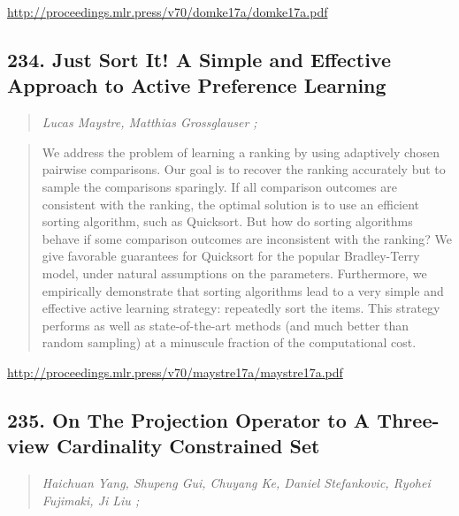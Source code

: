 \documentclass{article}
\begin{document}
\href{http://proceedings.mlr.press/v70/domke17a/domke17a.pdf}{http://proceedings.mlr.press/v70/domke17a/domke17a.pdf}

\subsection{234. Just Sort It! A Simple and Effective Approach to Active Preference Learning}

\begin{quote}
\footnotesize{\textit{Lucas Maystre, Matthias Grossglauser ;}}
\end{quote}

\begin{quote}
    We address the problem of learning a ranking by using adaptively chosen pairwise comparisons. Our goal is to recover the ranking accurately but to sample the comparisons sparingly. If all comparison outcomes are consistent with the ranking, the optimal solution is to use an efficient sorting algorithm, such as Quicksort. But how do sorting algorithms behave if some comparison outcomes are inconsistent with the ranking? We give favorable guarantees for Quicksort for the popular Bradley-Terry model, under natural assumptions on the parameters. Furthermore, we empirically demonstrate that sorting algorithms lead to a very simple and effective active learning strategy: repeatedly sort the items. This strategy performs as well as state-of-the-art methods (and much better than random sampling) at a minuscule fraction of the computational cost.  \end{quote}

\href{http://proceedings.mlr.press/v70/maystre17a/maystre17a.pdf}{http://proceedings.mlr.press/v70/maystre17a/maystre17a.pdf}

\subsection{235. On The Projection Operator to A Three-view Cardinality Constrained Set}

\begin{quote}
\footnotesize{\textit{Haichuan Yang, Shupeng Gui, Chuyang Ke, Daniel Stefankovic, Ryohei Fujimaki, Ji Liu ;}}
\end{quote}
\end{document}
